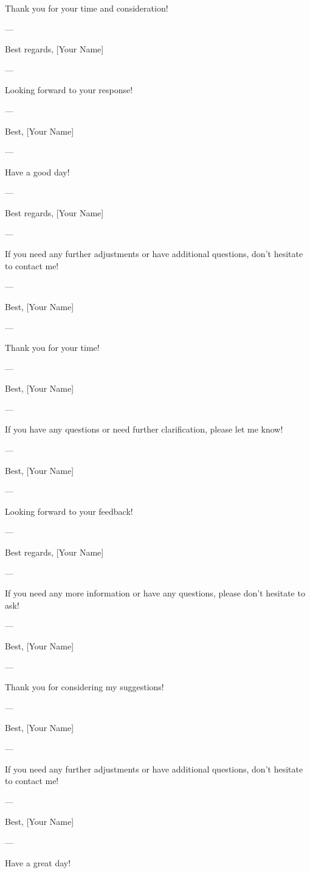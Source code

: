 Thank you for your time and consideration! 

--- 

Best regards,  
[Your Name]  

--- 

Looking forward to your response! 

--- 

Best,  
[Your Name]  

--- 

Have a good day! 

--- 

Best regards,  
[Your Name]  

--- 

If you need any further adjustments or have additional questions, don't hesitate to contact me! 

--- 

Best,  
[Your Name]  

--- 

Thank you for your time! 

--- 

Best,  
[Your Name]  

--- 

If you have any questions or need further clarification, please let me know! 

--- 

Best,  
[Your Name]  

--- 

Looking forward to your feedback! 

--- 

Best regards,  
[Your Name]  

--- 

If you need any more information or have any questions, please don't hesitate to ask! 

--- 

Best,  
[Your Name]  

--- 

Thank you for considering my suggestions! 

--- 

Best,  
[Your Name]  

--- 

If you need any further adjustments or have additional questions, don't hesitate to contact me! 

--- 

Best,  
[Your Name]  

--- 

Have a great day! 

